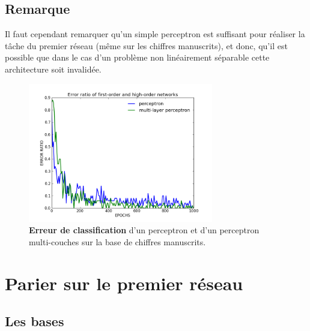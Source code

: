 \documentclass[a4paper,12pt, twoside]{article}
\begin{document}
\subsection{Remarque}

Il faut cependant remarquer qu'un simple perceptron est suffisant pour réaliser la tâche
du premier réseau (même sur les chiffres manuscrits), et donc, qu'il est possible que 
dans le cas d'un problème non linéairement séparable cette architecture soit invalidée.
 
\begin{figure}[H]
\begin{center}
 \includegraphics[height=230px]{../cleeremans_2007/digit_reco/p_vs_mlp.png}
\end{center}
\caption{ \textbf{Erreur de classification} d'un perceptron et d'un perceptron multi-couches
sur la base de chiffres manuscrits.}
\end{figure}

\section{Parier sur le premier réseau}

\subsection{Les bases}
\end{document}
